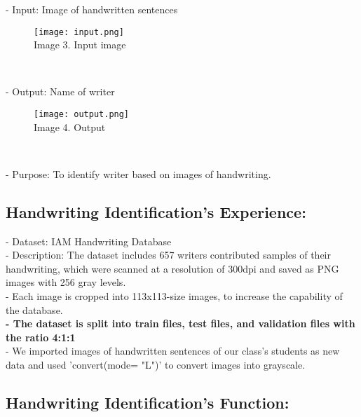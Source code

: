 \documentclass{article}
\begin{document}
- Input: Image of handwritten sentences 
\begin{figure}[h!]
\centering\texttt{[image: input.png]}
\\Image 3. Input image\\
\end{figure}\

- Output: Name of writer
\begin{figure}[h!]
\centering\texttt{[image: output.png]}
\\Image 4. Output\\
\end{figure}\

- Purpose: To identify writer based on images of handwriting. \\

\subsection{Handwriting Identification's Experience:}
- Dataset: IAM Handwriting Database \\
- Description: The dataset includes 657 writers contributed samples of their handwriting, which were scanned at a resolution of 300dpi and saved as PNG images with 256 gray levels. \\
- Each image is cropped into 113x113-size images, to increase the capability of the database.\\
\textbf{- The dataset is split into train files, test files, and validation files with the ratio 4:1:1} \\ 
- We imported images of handwritten sentences of our class's students as new data and used 'convert(mode= "L")' to convert images into grayscale.

\subsection{Handwriting Identification's Function:}
\end{document}
